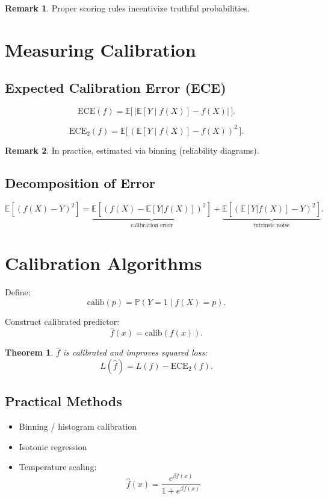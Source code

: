 \documentclass[12pt,oneside]{book}
\numberwithin{equation}{section}
\theoremstyle{definition}
\newtheorem{remark}{Remark}[section]
\theoremstyle{plain}
\newtheorem{theorem}{Theorem}[section]
\theoremstyle{remark}
\begin{document}
\begin{remark}
Proper scoring rules incentivize truthful probabilities.
\end{remark}

\section{Measuring Calibration}

\subsection{Expected Calibration Error (ECE)}

\[
\mathrm{ECE}(f)
=
\mathbb{E}\big[\,|\mathbb{E}[Y \mid f(X)] - f(X)|\,\big].
\]

\[
\mathrm{ECE}_2(f)
=
\mathbb{E}\big[\,(\mathbb{E}[Y \mid f(X)] - f(X))^2\,\big].
\]

\begin{remark}
In practice, estimated via binning (reliability diagrams).
\end{remark}

\subsection{Decomposition of Error}

\[
\mathbb{E}[(f(X)-Y)^2]
=
\underbrace{\mathbb{E}[(f(X)-\mathbb{E}[Y|f(X)])^2]}_{\text{calibration error}}
+
\underbrace{\mathbb{E}[(\mathbb{E}[Y|f(X)]-Y)^2]}_{\text{intrinsic noise}}.
\]

\section{Calibration Algorithms}

Define:
\[
\text{calib}(p) = \mathbb{P}(Y=1 \mid f(X)=p).
\]

Construct calibrated predictor:
\[
\hat f(x) = \text{calib}(f(x)).
\]

\begin{theorem}
$\hat f$ is calibrated and improves squared loss:
\[
L(\hat f) = L(f) - \mathrm{ECE}_2(f).
\]
\end{theorem}

\subsection{Practical Methods}

\begin{itemize}
    \item Binning / histogram calibration
    \item Isotonic regression
    \item Temperature scaling:
    \[
    \hat f(x) = \frac{e^{\beta f(x)}}{1 + e^{\beta f(x)}}
    \]
\end{itemize}
\end{document}
